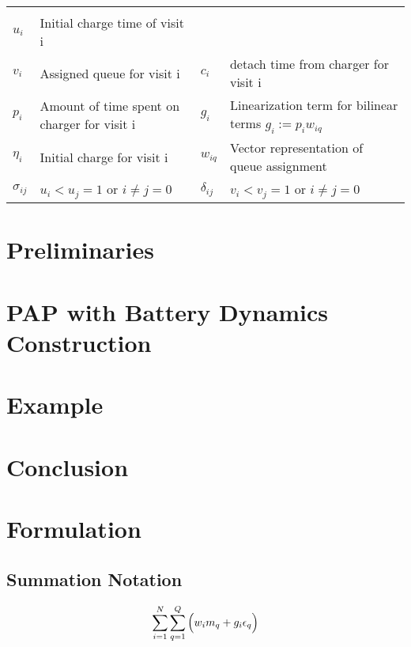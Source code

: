 \documentclass[conference]{IEEEtran}
\begin{document}
\begin{table*}[!t]
\begin{tabular}{l l l l}
		\hline
		\multicolumn{4}{l}{} \\
			$u_i$         & \textrm{Initial charge time of visit } i                                  \\
			$v_i$         & \textrm{Assigned queue for visit } i                                         &
			$c_i$         & \textrm{detach time from charger for  visit } i                           \\
			$p_i$         & \textrm{Amount of time spent on charger for visit } i                        &
			$g_i$         & \textrm{Linearization term for bilinear terms } $g_i := p_i w_{iq}$       \\
			$\eta_i$      & \textrm{Initial charge for visit } i                                         &
			$w_{iq}$      & \textrm{Vector representation of queue assignment}                        \\
			$\sigma_{ij}$ & $u_i < u_j = 1$ \textrm{ or } $i \neq j = 0$                                 &
			$\delta_{ij}$ & $v_i < v_j = 1$ \textrm{ or } $i \neq j = 0$                              \\
			\bottomrule
	\end{tabular}
\end{table*}
\section{Preliminaries}
\section{PAP with Battery Dynamics Construction}
\section{Example}
\section{Conclusion}

\section{Formulation}\label{formulation}

\subsection{Summation Notation}\label{summation-notation}

\begin{equation}\label{eq:objective}
    \sum_{i=1}^N \sum_{q=1}^Q \Big( w_i m_q + g_i \epsilon_q \Big)           \\
\end{equation}
\end{document}
